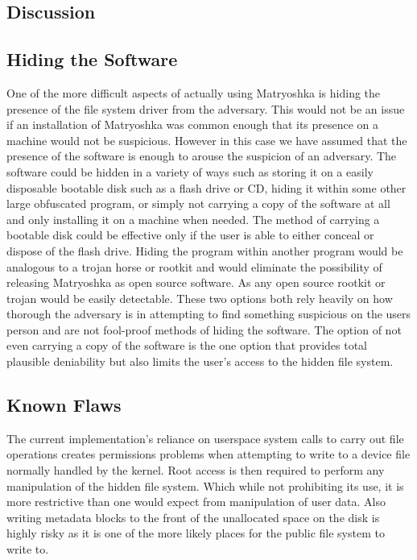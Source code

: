 \documentclass{article}
\begin{document}
\begin{multicols}{2}
\section{Discussion}


\subsection{Hiding the Software}

One of the more difficult aspects of actually using Matryoshka is hiding the presence of the file system driver from the adversary. This would not be an issue if an installation of Matryoshka was common enough that its presence on a machine would not be suspicious. However in this case we have assumed that the presence of the software is enough to arouse the suspicion of an adversary. The software could be hidden in a variety of ways such as storing it on a easily disposable bootable disk such as a flash drive or CD, hiding it within some other large obfuscated program, or simply not carrying a copy of the software at all and only installing it on a machine when needed. The method of carrying a bootable disk could be effective only if the user is able to either conceal or dispose of the flash drive. Hiding the program within another program would be analogous to a trojan horse or rootkit and would eliminate the possibility of releasing Matryoshka as open source software. As any open source rootkit or trojan would be easily detectable. These two options both rely heavily on how thorough the adversary is in attempting to find something suspicious on the users person and are not fool-proof methods of hiding the software. The option of not even carrying a copy of the software is the one option that provides total plausible deniability but also limits the user's access to the hidden file system. 

\subsection{Known Flaws} 
The current implementation's reliance on userspace system calls to carry out file operations creates permissions problems when attempting to write to a device file normally handled by the kernel. Root access is then required to perform any manipulation of the hidden file system. Which while not prohibiting its use, it is more restrictive than one would expect from manipulation of user data. Also writing metadata blocks to the front of the unallocated space on the disk is highly risky as it is one of the more likely places for the public file system to write to.


\end{multicols}
\end{document}
